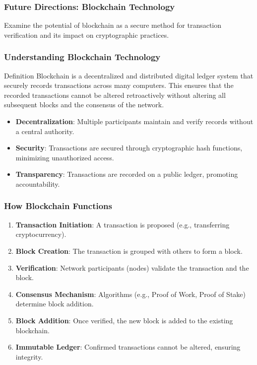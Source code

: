 \documentclass{beamer}
\begin{document}
\begin{frame}[fragile]
    \frametitle{Future Directions: Blockchain Technology}
    Examine the potential of blockchain as a secure method for transaction verification and its impact on cryptographic practices.
\end{frame}

\begin{frame}[fragile]
    \frametitle{Understanding Blockchain Technology}
    \begin{block}{Definition}
        Blockchain is a decentralized and distributed digital ledger system that securely records transactions across many computers. This ensures that the recorded transactions cannot be altered retroactively without altering all subsequent blocks and the consensus of the network.
    \end{block}
    
    \begin{itemize}
        \item \textbf{Decentralization}: Multiple participants maintain and verify records without a central authority.
        \item \textbf{Security}: Transactions are secured through cryptographic hash functions, minimizing unauthorized access.
        \item \textbf{Transparency}: Transactions are recorded on a public ledger, promoting accountability.
    \end{itemize}
\end{frame}

\begin{frame}[fragile]
    \frametitle{How Blockchain Functions}
    \begin{enumerate}
        \item \textbf{Transaction Initiation}: A transaction is proposed (e.g., transferring cryptocurrency).
        \item \textbf{Block Creation}: The transaction is grouped with others to form a block.
        \item \textbf{Verification}: Network participants (nodes) validate the transaction and the block.
        \item \textbf{Consensus Mechanism}: Algorithms (e.g., Proof of Work, Proof of Stake) determine block addition.
        \item \textbf{Block Addition}: Once verified, the new block is added to the existing blockchain.
        \item \textbf{Immutable Ledger}: Confirmed transactions cannot be altered, ensuring integrity.
    \end{enumerate}
\end{frame}
\end{document}
